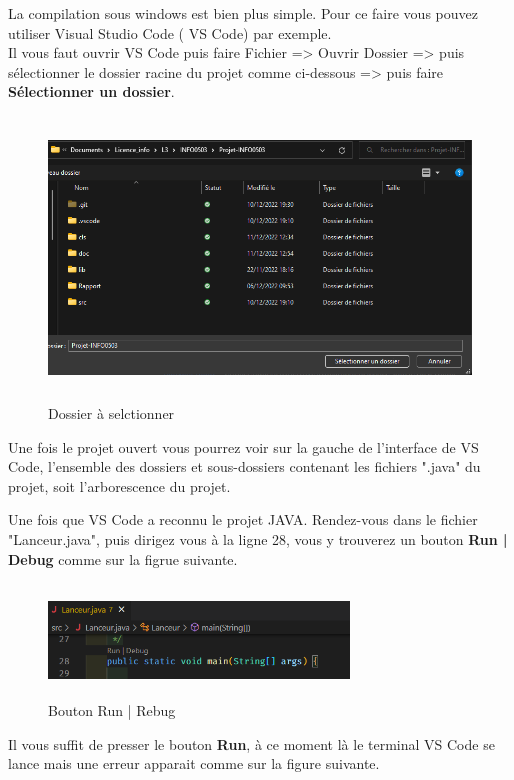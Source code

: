 La compilation sous windows est bien plus simple. Pour ce faire vous pouvez utiliser Visual Studio Code ( VS Code) par exemple. \\

Il vous faut ouvrir VS Code puis faire Fichier => Ouvrir Dossier => puis sélectionner le dossier racine du projet comme ci-dessous => puis faire \textbf{Sélectionner un dossier}.
\begin{figure}[h]
    \centering
    \includegraphics[width= 150mm, height=75mm]{images/FichierASelectionner.png}
    \caption{Dossier à selctionner}
    \label{img:mesh6}
\end{figure}


Une fois le projet ouvert vous pourrez voir sur la gauche de l'interface de VS Code, l'ensemble des dossiers et sous-dossiers contenant les fichiers ".java" du projet, soit l'arborescence du projet.

Une fois que VS Code a reconnu le projet JAVA. Rendez-vous dans le fichier "Lanceur.java", puis dirigez vous à la ligne 28, vous y trouverez un bouton \textbf{Run | Debug} comme sur la figrue suivante.
\begin{figure}[h]
    \centering
    \includegraphics[width= 80mm, height=30mm]{images/BoutonRunDebug.png}
    \caption{Bouton Run | Rebug}
    \label{img:mesh7}
\end{figure}

Il vous suffit de presser le bouton \textbf{Run}, à ce moment là le terminal VS Code se lance mais une erreur apparait comme sur la figure suivante.

